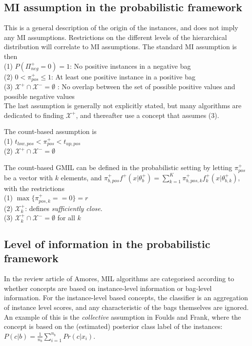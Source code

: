 %

\subsection{MI assumption in the probabilistic framework}
This is a general description of the origin of the instances, and does not imply any MI assumptions. 
Restrictions on the different levels of the hierarchical distribution will correlate to MI assumptions.
The standard MI assumption is then \\
(1) $P(\Pi^+_{neg} = 0) = 1$: No positive instances in a negative bag\\
(2) $0<\pi^+_{pos} \leq 1$: At least one positive instance in a positive bag\\
(3) $\mathcal{X}^+ \cap \mathcal{X}^- = \emptyset$ : No overlap between the set of possible positive values and possible negative values \\
The last assumption is generally not explicitly stated, but many algorithms are dedicated to finding $\mathcal{X}^+$, and thereafter use a concept that assumes (3). 

The count-based assumption is\\
(1) $t_{low,pos} < \pi^+_{pos} < t_{up,pos}$ \\
(2) $\mathcal{X}^+ \cap \mathcal{X}^- = \emptyset$ 

The count-based GMIL can be defined in the probabilistic setting by letting $\pi^+_{pos}$ be a vector with $k$ elements, and $\pi^+_{b,pos} f^+(x|\theta_b^+) = \sum_{k = 1}^K \pi^+_{b,pos,k} f^+_k(x|\theta_{b,k}^+)$, with the restrictions\\
(1) $\max \{\pi^+_{pos,k} == 0\} = r$ \\
(2) $\mathcal{X}^+_k$: defines {\it sufficiently close}. \\
(3) $\mathcal{X}^+_k \cap \mathcal{X}^- = \emptyset$ for all $k$ 

\subsection{Level of information in the probabilistic framework}
In the review article of Amores, MIL algorithms are categorised according to whether concepts are based on instance-level information or bag-level information. 
For the instance-level based concepts, the classifier is an aggregation of instance level scores, and any characteristic of the bags themselves are ignored. 
An example of this is the {\it collective} assumption in Foulds and Frank, where the concept is based on the (estimated) posterior class label of the instances: $P(c|b) = \frac{1}{n_b} \sum_{i = 1}^{n_b} Pr(c|x_i)$. 

